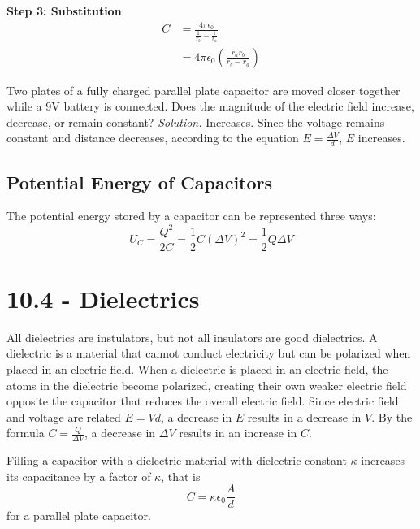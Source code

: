 \documentclass[12pt, titlepage]{article}
\begin{document}
\textbf{Step 3: Substitution}
\begin{align*}
    C &= \frac{4 \pi \epsilon_0}{\frac{1}{r_b}-\frac{1}{r_a}}\\
    &= 4 \pi \epsilon_0(\frac{r_{a}r_{b}}{r_{b}-r_a})
\end{align*}

\begin{Problem}
    Two plates of a fully charged parallel plate capacitor are moved closer together while a 9V battery is connected. Does the magnitude of the electric field increase, decrease, or remain constant? 
    \tcblower
    \textit{Solution. } Increases. Since the voltage remains constant and distance decreases, according to the equation $E=\frac{\Delta V}{d}$, $E$ increases.
\end{Problem}

\subsection*{Potential Energy of Capacitors}

The potential energy stored by a capacitor can be represented three ways:
\begin{equation*}
    U_C=\frac{Q^2}{2C}=\frac{1}{2}C(\Delta V)^2=\frac{1}{2}Q\Delta V
\end{equation*}

\newpage

\section*{10.4 - Dielectrics}

All dielectrics are instulators, but not all insulators are good dielectrics. A dielectric is a material that cannot conduct electricity but can be polarized when placed in an electric field. When a dielectric is placed in an electric field, the atoms in the dielectric become polarized, creating their own weaker electric field opposite the capacitor that reduces the overall electric field. Since electric field and voltage are related $E = Vd$, a decrease in $E$ results in a decrease in $V$. By the formula $C=\frac{Q}{\Delta V}$, a decrease in $\Delta V$ results in an increase in $C$.

Filling a capacitor with a dielectric material with dielectric constant $\kappa$ increases its capacitance by a factor of $\kappa$, that is 
\begin{equation*}
    C = \kappa \epsilon_0 \frac{A}{d} 
\end{equation*}
for a parallel plate capacitor.
\end{document}
